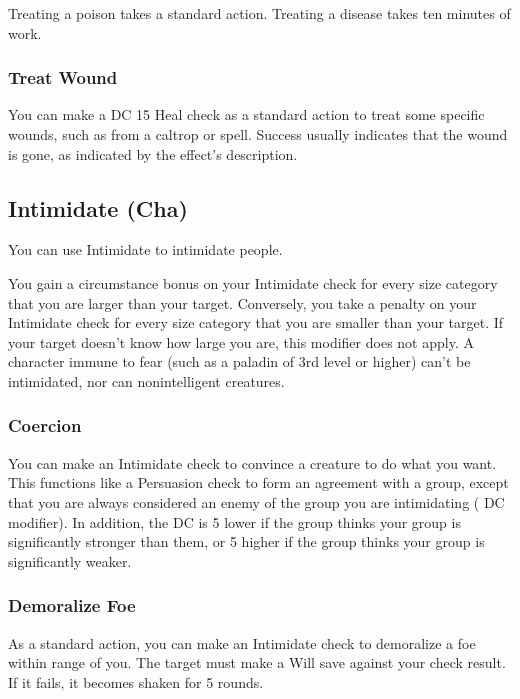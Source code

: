 Treating a poison takes a standard action. Treating a disease takes ten minutes of work.

\subsubsection{Treat Wound}
You can make a DC 15 Heal check as a standard action to treat some specific wounds, such as from a caltrop or  spell. Success usually indicates that the wound is gone, as indicated by the effect's description.

\subsection{Intimidate (Cha)}
You can use Intimidate to intimidate people.

You gain a  circumstance bonus on your Intimidate check for every size category that you are larger than your target. Conversely, you take a  penalty on your Intimidate check for every size category that you are smaller than your target. If your target doesn't know how large you are, this modifier does not apply. A character immune to fear (such as a paladin of 3rd level or higher) can't be intimidated, nor can nonintelligent creatures.

\subsubsection{Coercion}
You can make an Intimidate check to convince a creature to do what you want. This functions like a Persuasion check to form an agreement with a group, except that you are always considered an enemy of the group you are intimidating ( DC modifier). In addition, the DC is 5 lower if the group thinks your group is significantly stronger than them, or 5 higher if the group thinks your group is significantly weaker.

\subsubsection{Demoralize Foe}
As a standard action, you can make an Intimidate check to demoralize a foe within \rngmed range of you. The target must make a Will save against your check result. If it fails, it becomes shaken for 5 rounds.

